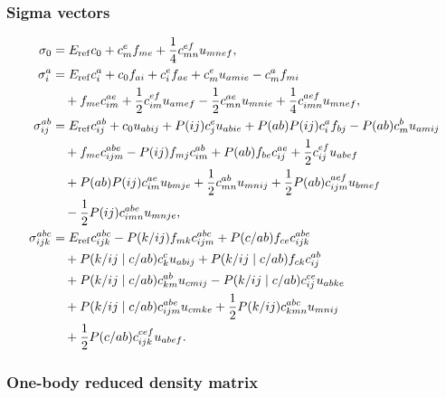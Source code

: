 \documentclass[11pt]{article}
\begin{document}
\subsubsection{Sigma vectors}

\begingroup
\small
\begin{align}
 \sigma_0
 &= E_{\mathrm{ref}}c_0+c_m^e f_{me}
    +\frac{1}{4}c_{mn}^{ef}u_{mnef},
 \\
 \sigma_i^a
 &= E_{\mathrm{ref}}c_i^a+c_0f_{ai}+c_i^e f_{ae}
    +c_m^e u_{amie}-c_m^a f_{mi}
 \notag\\
 &\quad
    +f_{me}c_{im}^{ae}
    +\frac{1}{2}c_{im}^{ef}u_{amef}
    -\frac{1}{2}c_{mn}^{ae}u_{mnie}
    +\frac{1}{4}c_{imn}^{aef}u_{mnef},
 \\
 \sigma_{ij}^{ab}
 &= E_{\mathrm{ref}}c_{ij}^{ab}+c_0u_{abij}
    +P(ij)c_j^e u_{abie}+P(ab)P(ij)c_i^a f_{bj}
    -P(ab)c_m^b u_{amij}
 \notag\\
 &\quad
    +f_{me}c_{ijm}^{abe}-P(ij)f_{mj}c_{im}^{ab}
    +P(ab)f_{be}c_{ij}^{ae}
    +\frac{1}{2}c_{ij}^{ef}u_{abef}
 \notag\\
 &\quad
    +P(ab)P(ij)c_{im}^{ae}u_{bmje}
    +\frac{1}{2}c_{mn}^{ab}u_{mnij}
    +\frac{1}{2}P(ab)c_{ijm}^{aef}u_{bmef}
 \notag\\
 &\quad
    -\frac{1}{2}P(ij)c_{imn}^{abe}u_{mnje},
 \\
 \sigma_{ijk}^{abc}
 &= E_{\mathrm{ref}}c_{ijk}^{abc}
    -P(k/ij)f_{mk}c_{ijm}^{abc}
    +P(c/ab)f_{ce}c_{ijk}^{abe}
 \notag\\
 &\quad
    +P(k/ij\mid c/ab)c_k^c u_{abij}
    +P(k/ij\mid c/ab)f_{ck}c_{ij}^{ab}
 \notag\\
 &\quad
    +P(k/ij\mid c/ab)c_{km}^{ab}u_{cmij}
    -P(k/ij\mid c/ab)c_{ij}^{ce}u_{abke}
 \notag\\
 &\quad
    +P(k/ij\mid c/ab)c_{ijm}^{abe}u_{cmke}
    +\frac{1}{2}P(k/ij)c_{kmn}^{abc}u_{mnij}
 \notag\\
 &\quad
    +\frac{1}{2}P(c/ab)c_{ijk}^{cef}u_{abef}.
\end{align}
\endgroup

\subsubsection{One-body reduced density matrix}
\end{document}
